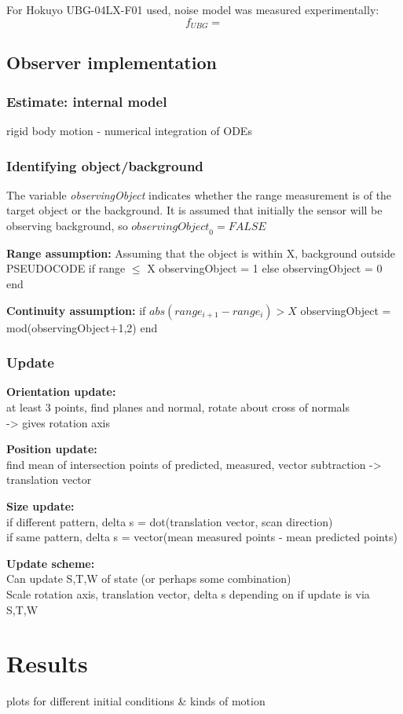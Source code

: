 	For Hokuyo UBG-04LX-F01 used, noise model was measured experimentally:
	\begin{equation}
		f_{UBG} = 
	\end{equation}
	
\subsection{Observer implementation}
	\subsubsection{Estimate: internal model}
		rigid body motion - numerical integration of ODEs
	
	\subsubsection{Identifying object/background}
		The variable \textit{observingObject} indicates whether the range measurement is of the target object or the background. It is assumed that initially the sensor will be observing background, so $\textit{observingObject}_0 = FALSE$

		\textbf{Range assumption:}
		Assuming that the object is within X, background outside
		PSEUDOCODE
		if range $\leq$ X
			observingObject = 1
		else
			observingObject = 0
		end
		
		\textbf{Continuity assumption:}
		if $abs(range_{i+1}-range_i) > X$
			observingObject = mod(observingObject+1,2)
		end
	\subsubsection{Update}
		\textbf{Orientation update:}\\
			at least 3 points, find planes and normal, rotate about cross of normals\\
			-> gives rotation axis
			
		\textbf{Position update:}\\
			find mean of intersection points of predicted, measured, vector subtraction
			-> translation vector
			
		\textbf{Size update:}\\
			if different pattern, delta s = dot(translation vector, scan direction)\\
			if same pattern, delta s = vector(mean measured points - mean predicted points)
			
		\textbf{Update scheme:}\\
			Can update S,T,W of state (or perhaps some combination)\\
			Scale rotation axis, translation vector, delta s depending on if update is via S,T,W
			
\section{Results}
plots for different initial conditions \& kinds of motion
	
